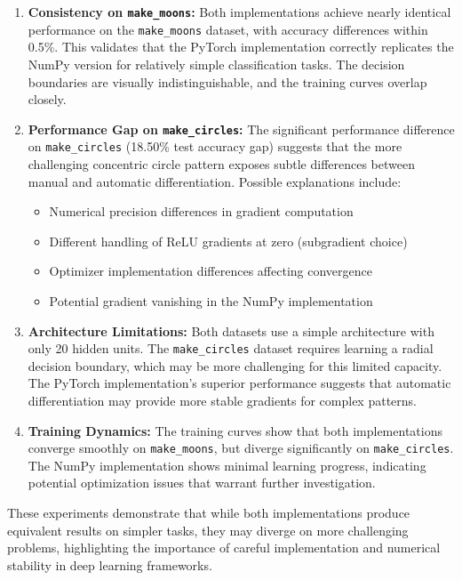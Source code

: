 \documentclass[11pt,a4paper]{article}
\begin{document}
\begin{enumerate}
    \item \textbf{Consistency on \texttt{make\_moons}:} Both implementations achieve nearly identical performance on the \texttt{make\_moons} dataset, with accuracy differences within 0.5\%. This validates that the PyTorch implementation correctly replicates the NumPy version for relatively simple classification tasks. The decision boundaries are visually indistinguishable, and the training curves overlap closely.
    
    \item \textbf{Performance Gap on \texttt{make\_circles}:} The significant performance difference on \texttt{make\_circles} (18.50\% test accuracy gap) suggests that the more challenging concentric circle pattern exposes subtle differences between manual and automatic differentiation. Possible explanations include:
    \begin{itemize}
        \item Numerical precision differences in gradient computation
        \item Different handling of ReLU gradients at zero (subgradient choice)
        \item Optimizer implementation differences affecting convergence
        \item Potential gradient vanishing in the NumPy implementation
    \end{itemize}
    
    \item \textbf{Architecture Limitations:} Both datasets use a simple architecture with only 20 hidden units. The \texttt{make\_circles} dataset requires learning a radial decision boundary, which may be more challenging for this limited capacity. The PyTorch implementation's superior performance suggests that automatic differentiation may provide more stable gradients for complex patterns.
    
    \item \textbf{Training Dynamics:} The training curves show that both implementations converge smoothly on \texttt{make\_moons}, but diverge significantly on \texttt{make\_circles}. The NumPy implementation shows minimal learning progress, indicating potential optimization issues that warrant further investigation.
\end{enumerate}

These experiments demonstrate that while both implementations produce equivalent results on simpler tasks, they may diverge on more challenging problems, highlighting the importance of careful implementation and numerical stability in deep learning frameworks.
\end{document}

